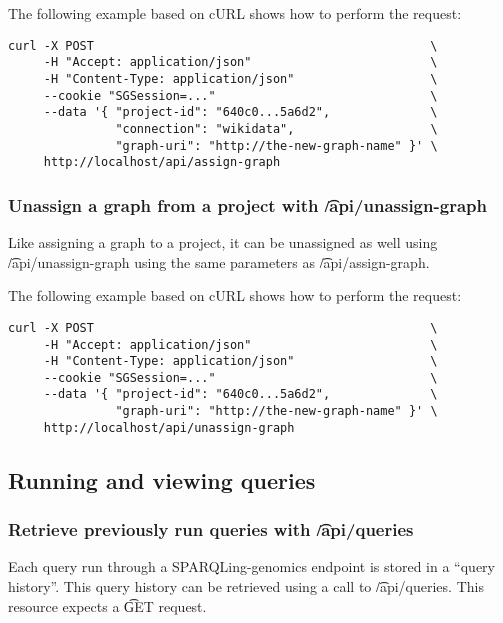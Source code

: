   The following example based on cURL shows how to perform the request:
\begin{siderules}
\begin{verbatim}
curl -X POST                                               \
     -H "Accept: application/json"                         \
     -H "Content-Type: application/json"                   \
     --cookie "SGSession=..."                              \
     --data '{ "project-id": "640c0...5a6d2",              \
               "connection": "wikidata",                   \
               "graph-uri": "http://the-new-graph-name" }' \
     http://localhost/api/assign-graph
\end{verbatim}
\end{siderules}

\subsubsection{Unassign a graph from a project with \t{/api/unassign-graph}}

  Like assigning a graph to a project, it can be unassigned as well using
  \t{/api/unassign-graph} using the same parameters as
  \t{/api/assign-graph}.

  The following example based on cURL shows how to perform the request:
\begin{siderules}
\begin{verbatim}
curl -X POST                                               \
     -H "Accept: application/json"                         \
     -H "Content-Type: application/json"                   \
     --cookie "SGSession=..."                              \
     --data '{ "project-id": "640c0...5a6d2",              \
               "graph-uri": "http://the-new-graph-name" }' \
     http://localhost/api/unassign-graph
\end{verbatim}
\end{siderules}

\pagebreak{}
\subsection{Running and viewing queries}

\subsubsection{Retrieve previously run queries with \t{/api/queries}}

  Each query run through a SPARQLing-genomics endpoint is stored in
  a ``query history''.  This query history can be retrieved using a
  call to \t{/api/queries}.  This resource expects a \t{GET} request.

